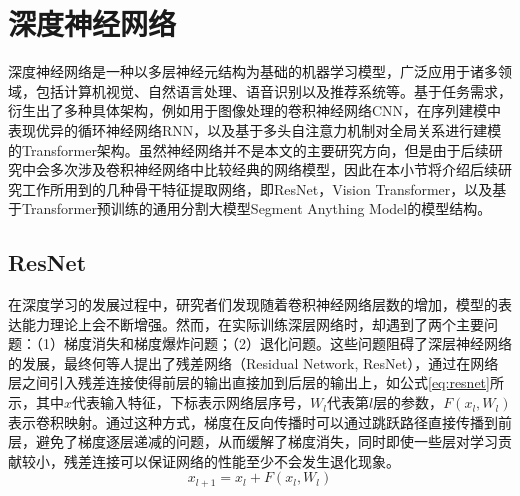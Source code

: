 \documentclass[lang=chs, degree=master, blindreview=false, adobe=false]{yanputhesis}
\begin{document}
\section{深度神经网络}
深度神经网络是一种以多层神经元结构为基础的机器学习模型，广泛应用于诸多领域，包括计算机视觉、自然语言处理、语音识别以及推荐系统等。基于任务需求，衍生出了多种具体架构，例如用于图像处理的卷积神经网络CNN，在序列建模中表现优异的循环神经网络RNN，以及基于多头自注意力机制对全局关系进行建模的Transformer架构。虽然神经网络并不是本文的主要研究方向，但是由于后续研究中会多次涉及卷积神经网络中比较经典的网络模型，因此在本小节将介绍后续研究工作所用到的几种骨干特征提取网络，即ResNet，Vision Transformer，以及基于Transformer预训练的通用分割大模型Segment Anything Model的模型结构。
\subsection{ResNet}
在深度学习的发展过程中，研究者们发现随着卷积神经网络层数的增加，模型的表达能力理论上会不断增强。然而，在实际训练深层网络时，却遇到了两个主要问题：（1）梯度消失和梯度爆炸问题；（2）退化问题。这些问题阻碍了深层神经网络的发展，最终何等人\cite{He2015ResNet}提出了残差网络（Residual Network, ResNet），通过在网络层之间引入残差连接使得前层的输出直接加到后层的输出上，如公式\ref{eq:resnet}所示，其中$x$代表输入特征，下标表示网络层序号，$W_l$代表第$l$层的参数，$F\left(x_l,W_l\right)$表示卷积映射。通过这种方式，梯度在反向传播时可以通过跳跃路径直接传播到前层，避免了梯度逐层递减的问题，从而缓解了梯度消失，同时即使一些层对学习贡献较小，残差连接可以保证网络的性能至少不会发生退化现象。
\begin{equation}
  \label{eq:resnet}
  x_{l+1} = x_l + F\left(x_l,W_l\right)
\end{equation}
\end{document}
